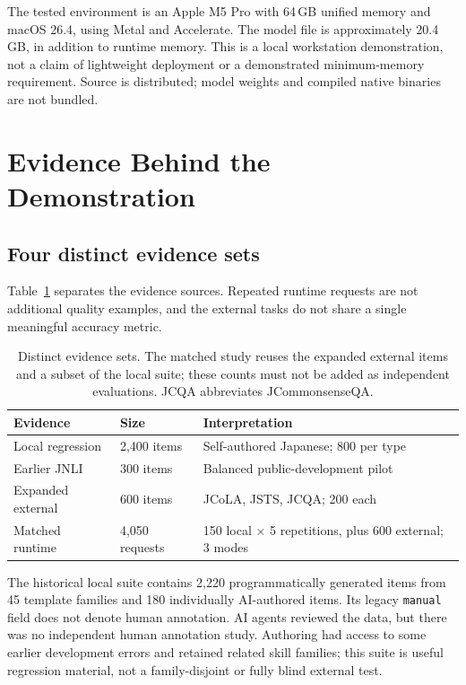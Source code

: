 \documentclass[11pt]{article}
\begin{document}
The tested environment is an Apple M5 Pro with 64\,GB unified memory and macOS 26.4, using Metal and Accelerate. The model file is approximately 20.4\,GB, in addition to runtime memory. This is a local workstation demonstration, not a claim of lightweight deployment or a demonstrated minimum-memory requirement. Source is distributed; model weights and compiled native binaries are not bundled.

\section{Evidence Behind the Demonstration}
\label{sec:evidence}
\subsection{Four distinct evidence sets}
Table~\ref{tab:sets} separates the evidence sources. Repeated runtime requests are not additional quality examples, and the external tasks do not share a single meaningful accuracy metric.

\begin{table}[t]
\centering
\small
\setlength{\tabcolsep}{3pt}
\begin{tabular}{@{}p{1.72cm}p{1.44cm}p{4.08cm}@{}}
\toprule
Evidence & Size & Interpretation \\
\midrule
Local regression & 2,400 items & Self-authored Japanese; 800 per type \\
Earlier JNLI & 300 items & Balanced public-development pilot \\
Expanded external & 600 items & JCoLA, JSTS, JCQA; 200 each \\
Matched runtime & 4,050 requests & 150 local $\times$ 5 repetitions, plus 600 external; 3 modes \\
\bottomrule
\end{tabular}
\caption{Distinct evidence sets. The matched study reuses the expanded external items and a subset of the local suite; these counts must not be added as independent evaluations. JCQA abbreviates JCommonsenseQA.}
\label{tab:sets}
\end{table}

The historical local suite contains 2,220 programmatically generated items from 45 template families and 180 individually AI-authored items. Its legacy \texttt{manual} field does not denote human annotation. AI agents reviewed the data, but there was no independent human annotation study. Authoring had access to some earlier development errors and retained related skill families; this suite is useful regression material, not a family-disjoint or fully blind external test.
\end{document}
